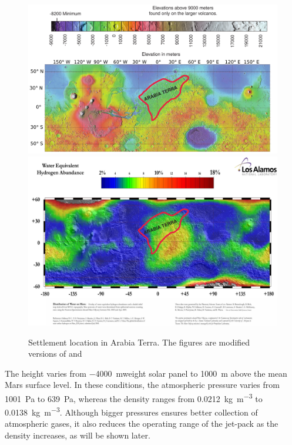 \documentclass[twocolumn]{article}
\begin{document}
\begin{figure}
  \centering
  \includegraphics[width=\textwidth]{img/mola_regional_boundaries_2}
  \includegraphics[width=\textwidth]{img/mola_regional_boundaries_3}
  \caption{Settlement location in Arabia Terra. The figures are modified 
versions of \cite{mars_elevation_and_boundaries} and \cite{water_on_mars}}
  \label{fig:arabia_terra}
\end{figure}

The height varies from \SI{-4000}{\metre}weight solar panel to 
\SI{1000}{\metre} 
above the mean 
Mars surface level. In these conditions, the atmospheric pressure varies from
\SI{1001}{\pascal} to \SI{639}{\pascal}, whereas the density ranges from 
\SI{0.0212}{\kilogram\per\cubic\meter} to 
\SI{0.0138}{\kilogram\per\cubic\meter}. Although bigger pressures ensures 
better 
collection of atmospheric gases, it also reduces the operating range of the 
jet-pack as the density increases, as will be shown later.
\end{document}
